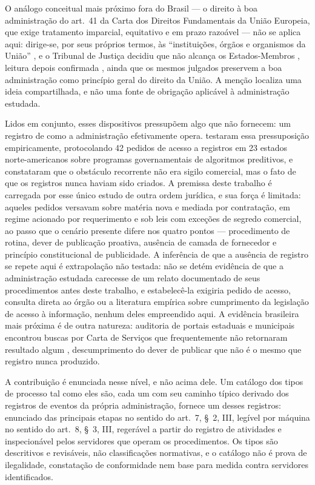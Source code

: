 O análogo conceitual mais próximo fora do Brasil --- o direito à boa administração do art.~41 da
Carta dos Direitos Fundamentais da União Europeia, que exige tratamento imparcial, equitativo e em
prazo razoável --- não se aplica aqui: dirige-se, por seus próprios termos, às ``instituições,
órgãos e organismos da União'' \cite{eu2012charter}, e o Tribunal de Justiça decidiu que não alcança
os Estados-Membros \cite[par.~67]{cjeu2014ys}, leitura depois confirmada
\cite[par.~44]{cjeu2014mukarubega}, ainda que os mesmos julgados preservem a boa administração como
princípio geral do direito da União. A menção localiza uma ideia compartilhada, e não uma fonte de
obrigação aplicável à administração estudada.

Lidos em conjunto, esses dispositivos pressupõem algo que não fornecem: um registro de como a
administração efetivamente opera.  testaram essa pressuposição
empiricamente, protocolando 42 pedidos de acesso a registros em 23 estados norte-americanos sobre
programas governamentais de algoritmos preditivos, e constataram que o obstáculo recorrente não era
sigilo comercial, mas o fato de que os registros nunca haviam sido criados. A premissa deste
trabalho é carregada por esse único estudo de outra ordem jurídica, e sua força é limitada: aqueles
pedidos versavam sobre matéria nova e mediada por contratação, em regime acionado por requerimento e
sob leis com exceções de segredo comercial, ao passo que o cenário presente difere nos quatro pontos
--- procedimento de rotina, dever de publicação proativa, ausência de camada de fornecedor e
princípio constitucional de publicidade. A inferência de que a ausência de registro se repete aqui é
extrapolação não testada: não se detém evidência de que a administração estudada carecesse de um
relato documentado de seus procedimentos antes deste trabalho, e estabelecê-la exigiria pedido de
acesso, consulta direta ao órgão ou a literatura empírica sobre cumprimento da legislação de acesso
à informação, nenhum deles empreendido aqui. A evidência brasileira mais próxima é de outra
natureza: auditoria de portais estaduais e municipais encontrou buscas por Carta de Serviços que
frequentemente não retornaram resultado algum \cite{brjuruena2021usuario}, descumprimento do dever
de publicar que não é o mesmo que registro nunca produzido.

A contribuição é enunciada nesse nível, e não acima dele. Um catálogo dos tipos de processo tal como
eles são, cada um com seu caminho típico derivado dos registros de eventos da própria administração,
fornece um desses registros: enunciado das principais etapas no sentido do
art.~7\textordmasculine{}, \S~2\textordmasculine{}, III, legível por máquina no sentido do
art.~8\textordmasculine{}, \S~3\textordmasculine{}, III, regerável a partir do registro de atividades
e inspecionável pelos servidores que operam os procedimentos. Os tipos são descritivos e revisáveis,
não classificações normativas, e o catálogo não é prova de ilegalidade, constatação de conformidade
nem base para medida contra servidores identificados.

